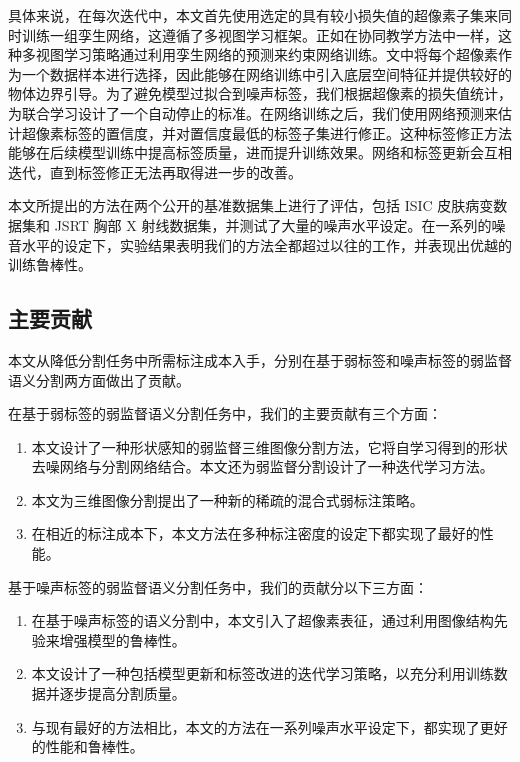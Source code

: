 具体来说，在每次迭代中，本文首先使用选定的具有较小损失值的超像素子集来同时训练一组孪生网络，这遵循了多视图学习框架\citep{Han2018CoteachingRT,Wei2020CombatingNL}。正如在协同教学方法中一样，这种多视图学习策略通过利用孪生网络的预测来约束网络训练。文中将每个超像素作为一个数据样本进行选择，因此能够在网络训练中引入底层空间特征并提供较好的物体边界引导。为了避免模型过拟合到噪声标签，我们根据超像素的损失值统计，为联合学习设计了一个自动停止的标准。在网络训练之后，我们使用网络预测来估计超像素标签的置信度，并对置信度最低的标签子集进行修正。这种标签修正方法能够在后续模型训练中提高标签质量，进而提升训练效果。网络和标签更新会互相迭代，直到标签修正无法再取得进一步的改善。

本文所提出的方法在两个公开的基准数据集上进行了评估，包括 ISIC 皮肤病变数据集\citep{Gutman2018SkinLA}和 JSRT 胸部 X 射线数据集\citep{Ginneken2006SegmentationOA,Shiraishi2000DevelopmentOA}，并测试了大量的噪声水平设定。在一系列的噪音水平的设定下，实验结果表明我们的方法全都超过以往的工作，并表现出优越的训练鲁棒性。

\subsection{主要贡献}
本文从降低分割任务中所需标注成本入手，分别在基于弱标签和噪声标签的弱监督语义分割两方面做出了贡献。

在基于弱标签的弱监督语义分割任务中，我们的主要贡献有三个方面：
\begin{enumerate}
\item 本文设计了一种形状感知的弱监督三维图像分割方法，它将自学习得到的形状去噪网络与分割网络结合。本文还为弱监督分割设计了一种迭代学习方法。
\item 本文为三维图像分割提出了一种新的稀疏的混合式弱标注策略。
\item 在相近的标注成本下，本文方法在多种标注密度的设定下都实现了最好的性能。
\end{enumerate}


基于噪声标签的弱监督语义分割任务中，我们的贡献分以下三方面：
\begin{enumerate}
    \item 在基于噪声标签的语义分割中，本文引入了超像素表征，通过利用图像结构先验来增强模型的鲁棒性。
    \item 本文设计了一种包括模型更新和标签改进的迭代学习策略，以充分利用训练数据并逐步提高分割质量。
    \item 与现有最好的方法相比，本文的方法在一系列噪声水平设定下，都实现了更好的性能和鲁棒性。
\end{enumerate}

